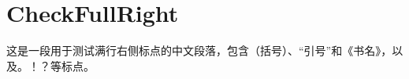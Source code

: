 \documentclass[a4paper,10pt,UTF8,scheme=chinese]{ctexart}
\begin{document}
\section{CheckFullRight}
这是一段用于测试满行右侧标点的中文段落，包含（括号）、“引号”和《书名》，以及。！？等标点。
\end{document}
